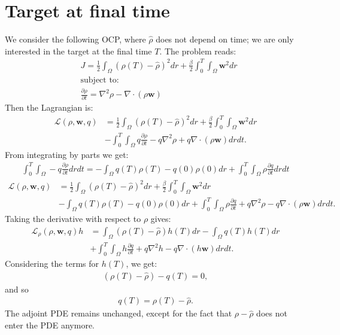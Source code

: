\documentclass[11pt, a4paper]{article}
\theoremstyle{definition}
\newcommand{\w}{\mathbf{w}}
\begin{document}
	\section{Target at final time}
	We consider the following OCP, where $\widehat \rho$ does not depend on time; we are only interested in the target at the final time $T$. The problem reads:
	\begin{align*}
		&J = \frac{1}{2} \int_\Omega (\rho(T) - \widehat \rho)^2 dr  + \frac{\beta}{2} \int_0^T\int_\Omega \w^2 dr\\
		&\text{subject to:}\\
		&\frac{\partial \rho}{\partial t} = \nabla^2 \rho - \nabla \cdot (\rho \w)
	\end{align*}
	Then the Lagrangian is:
	\begin{align*}
		\mathcal{L}(\rho,\w, q) &= \frac{1}{2} \int_\Omega (\rho(T) - \widehat \rho)^2 dr  + \frac{\beta}{2} \int_0^T\int_\Omega \w^2 dr\\
		&- \int_0^T \int_\Omega q\frac{\partial \rho}{\partial t} - q\nabla^2 \rho + q\nabla \cdot (\rho \w) dr dt.
	\end{align*}
	From integrating by parts we get:
	\begin{align*}
	\int_0^T \int_\Omega	-q\frac{\partial \rho}{\partial t} dr dt= - \int_\Omega q(T) \rho(T) - q(0) \rho(0) dr +  \int_0^T \int_\Omega	\rho \frac{\partial q}{\partial t} dr dt
	\end{align*}
		\begin{align*}
		\mathcal{L}(\rho,\w, q) &= \frac{1}{2} \int_\Omega (\rho(T) - \widehat \rho)^2 dr  + \frac{\beta}{2} \int_0^T\int_\Omega \w^2 dr\\
		&- \int_\Omega q(T) \rho(T) - q(0) \rho(0) dr + \int_0^T \int_\Omega \rho \frac{\partial q}{\partial t}   + q\nabla^2 \rho - q\nabla \cdot (\rho \w) dr dt.
	\end{align*}
	Taking the derivative with respect to $\rho $ gives:
	\begin{align*}
		\mathcal{L}_\rho(\rho,\w, q)h &= \int_\Omega  (\rho(T) - \widehat \rho) h(T) dr - \int_\Omega q(T) h(T) dr\\
		&+ \int_0^T \int_\Omega h \frac{\partial q}{\partial t}   + q\nabla^2 h - q\nabla \cdot (h \w) dr dt.
	\end{align*}
	Considering the terms for $h(T)$, we get:
	\begin{align*}
		(\rho(T) - \widehat \rho) - q(T) = 0,
	\end{align*}
	and so 
	\begin{align*}
	q(T) = \rho(T) - \widehat \rho.
	\end{align*}
	The adjoint PDE remains unchanged, except for the fact that $ \rho - \widehat \rho$ does not enter the PDE anymore.
\end{document}
